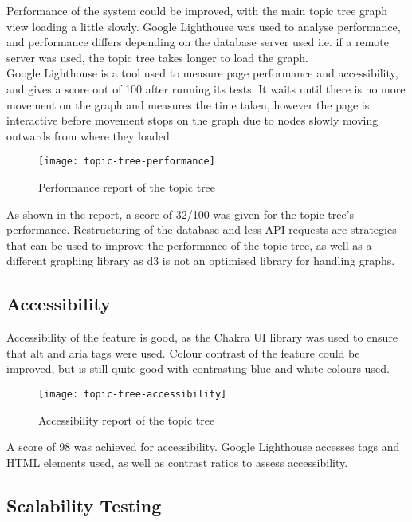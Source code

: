 Performance of the system could be improved, with the main topic tree graph view loading a little slowly. Google Lighthouse was used to analyse performance, and performance differs depending on the database server used i.e. if a remote server was used, the topic tree takes longer to load the graph.\\

Google Lighthouse is a tool used to measure page performance and accessibility, and gives a score out of 100 after running its tests. It waits until there is no more movement on the graph and measures the time taken, however the page is interactive before movement stops on the graph due to nodes slowly moving outwards from where they loaded.\\

\begin{figure}[h!]
    \centering
    \texttt{[image: topic-tree-performance]}
    \caption{Performance report of the topic tree}
\end{figure}

As shown in the report, a score of 32/100 was given for the topic tree's performance. Restructuring of the database and less API requests are strategies that can be used to improve the performance of the topic tree, as well as a different graphing library as d3 is not an optimised library for handling graphs.\\

\subsection{Accessibility}
Accessibility of the feature is good, as the Chakra UI library was used to ensure that alt and aria tags were used. Colour contrast of the feature could be improved, but is still quite good with contrasting blue and white colours used. \\

\begin{figure}[h!]
    \centering
    \texttt{[image: topic-tree-accessibility]}
    \caption{Accessibility report of the topic tree}
\end{figure}

A score of 98 was achieved for accessibility. Google Lighthouse accesses tags and HTML elements used, as well as contrast ratios to assess accessibility.\\

\subsection{Scalability Testing}

